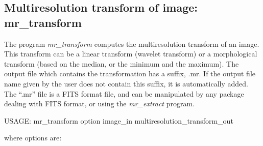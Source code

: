 \subsection{Multiresolution transform of image: mr\_transform}
\label{sect_trans}
The program 
{\em mr\_transform} computes the multiresolution transform of an image.
This transform can be a linear transform (wavelet transform) or
a morphological transform (based on the median, or the minimum 
and the maximum).  
The output file which contains the transformation has a 
suffix, .mr. If the output file name
given by the user does not contain this suffix, it is automatically
added. The ``.mr'' file is a FITS format file, and can be manipulated by
any package dealing with FITS format, or using the 
{\em mr\_extract} program.
{\bf
\begin{center}
 USAGE: mr\_transform option image\_in multiresolution\_transform\_out
\end{center}}
where options are: 
